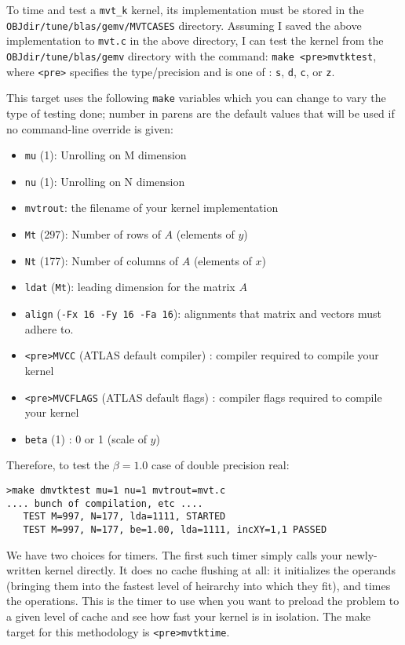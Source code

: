 \documentclass[11pt]{article}
\newcommand{\kernk}[1]{{\tt #1\_k}}
\begin{document}
To time and test a \kernk{mvt} kernel, its implementation must be stored in 
the\\ {\tt OBJdir/tune/blas/gemv/MVTCASES} directory.  Assuming I saved the
above implementation to {\tt mvt.c} in the above directory, I can test
the kernel from the {\tt OBJdir/tune/blas/gemv} directory with the
command: \verb+make <pre>mvtktest+, where \verb+<pre>+ specifies the
type/precision and is one of : {\tt s}, {\tt d}, {\tt c}, or {\tt z}.

This target uses the following {\tt make} variables which you can change
to vary the type of testing done; number in parens are the default values
that will be used if no command-line override is given:
\begin{itemize}
\item \verb+mu+ (1): Unrolling on M dimension
\item \verb+nu+ (1): Unrolling on N dimension
\item \verb+mvtrout+: the filename of your kernel implementation
\item \verb+Mt+ (297): Number of rows of $A$ (elements of $y$)
\item \verb+Nt+ (177): Number of columns of $A$ (elements of $x$)
\item \verb+ldat+ (\verb+Mt+): leading dimension for the matrix $A$
\item \verb+align+ (\verb+-Fx 16 -Fy 16 -Fa 16+): alignments that
      matrix and vectors must adhere to.
\item \verb+<pre>MVCC+ (ATLAS default compiler) : compiler required
      to compile your kernel
\item \verb+<pre>MVCFLAGS+ (ATLAS default flags) : compiler flags required
      to compile your kernel
\item \verb+beta+ (1) : 0 or 1 (scale of $y$)
\end{itemize}

Therefore, to test the $\beta=1.0$ case of double precision real:
\begin{verbatim}
>make dmvtktest mu=1 nu=1 mvtrout=mvt.c
.... bunch of compilation, etc ....
   TEST M=997, N=177, lda=1111, STARTED
   TEST M=997, N=177, be=1.00, lda=1111, incXY=1,1 PASSED
\end{verbatim}

We have two choices for timers.
The first such timer simply calls your newly-written kernel directly.
It does no cache flushing at all: it initializes the operands
(bringing them into the fastest level of heirarchy into which they fit),
and times the operations.  This is the timer to use when you want to preload
the problem to a given level of cache and see how fast your kernel is in
isolation.  The make target for this methodology is \verb+<pre>mvtktime+.
\end{document}
